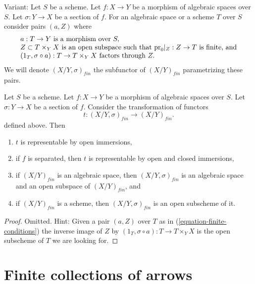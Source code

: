 \noindent
Variant: Let $S$ be a scheme.
Let $f : X \to Y$ be a morphism of algebraic spaces over $S$.
Let $\sigma : Y \to X$ be a section of $f$.
For an algebraic space or a scheme $T$ over $S$ consider pairs
$(a, Z)$ where
\begin{equation}
\label{equation-finite-conditions-variant}
\begin{matrix}
a : T \to Y\text{ is a morphism over }S, \hfill \\
Z \subset T \times_Y X\text{ is an open subspace such that }
\text{pr}_0|_Z : Z \to T\text{ is finite, and} \\
(1_T, \sigma \circ a) : T \to T \times_Y X\text{ factors through }Z.\hfill
\end{matrix}
\end{equation}
We will denote $(X/Y, \sigma)_{fin}$ the subfunctor of $(X/Y)_{fin}$
parametrizing these pairs.

\begin{lemma}
\label{lemma-finite-plus-section}
Let $S$ be a scheme.
Let $f : X \to Y$ be a morphism of algebraic spaces over $S$.
Let $\sigma : Y \to X$ be a section of $f$. Consider the
transformation of functors
$$
t : (X/Y, \sigma)_{fin} \longrightarrow (X/Y)_{fin}.
$$
defined above. Then
\begin{enumerate}
\item $t$ is representable by open immersions,
\item if $f$ is separated, then $t$ is representable by open
and closed immersions,
\item if $(X/Y)_{fin}$ is an algebraic space, then
$(X/Y, \sigma)_{fin}$ is an algebraic space and
an open subspace of $(X/Y)_{fin}$, and
\item if $(X/Y)_{fin}$ is a scheme, then $(X/Y, \sigma)_{fin}$ is an
open subscheme of it.
\end{enumerate}
\end{lemma}

\begin{proof}
Omitted. Hint: Given a pair $(a, Z)$ over $T$ as in
(\ref{equation-finite-conditions}) the inverse image of
$Z$ by $(1_T, \sigma \circ a) : T \to T \times_Y X$ is the open
subscheme of $T$ we are looking for.
\end{proof}





\section{Finite collections of arrows}
\label{section-finite-set-arrows}

